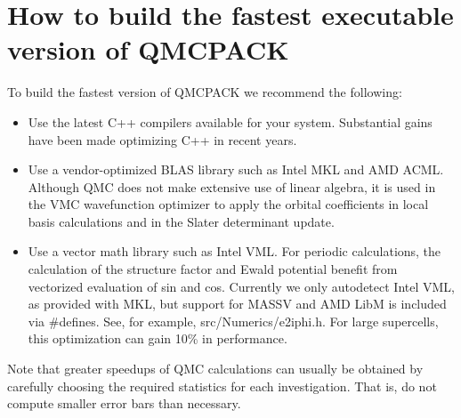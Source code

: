\section{How to build the fastest executable version of QMCPACK}
\label{sec:buildperformance}
To build the fastest version of QMCPACK we recommend the following:
\begin{itemize}
\item Use the latest C++ compilers available for your
  system. Substantial gains have been made optimizing C++ in recent
  years.
\item Use a vendor-optimized BLAS library such as Intel MKL and AMD ACML. Although
  QMC does not make extensive use of linear algebra, it is used in the
  VMC wavefunction optimizer to apply the orbital coefficients in local basis
  calculations and in the Slater determinant update.
\item Use a vector math library such as Intel VML.  For periodic
  calculations, the calculation of the structure factor and Ewald
  potential benefit from vectorized evaluation of sin and
  cos. Currently we only autodetect Intel VML, as provided with MKL,
  but support for MASSV and AMD LibM is included via \#defines. See,
 for example, src/Numerics/e2iphi.h. For
  large supercells, this optimization can gain 10\% in performance.
\end{itemize}

Note that greater speedups of QMC calculations can usually be obtained by
carefully choosing the required statistics for each
investigation. That is, do not compute smaller error bars than necessary.

